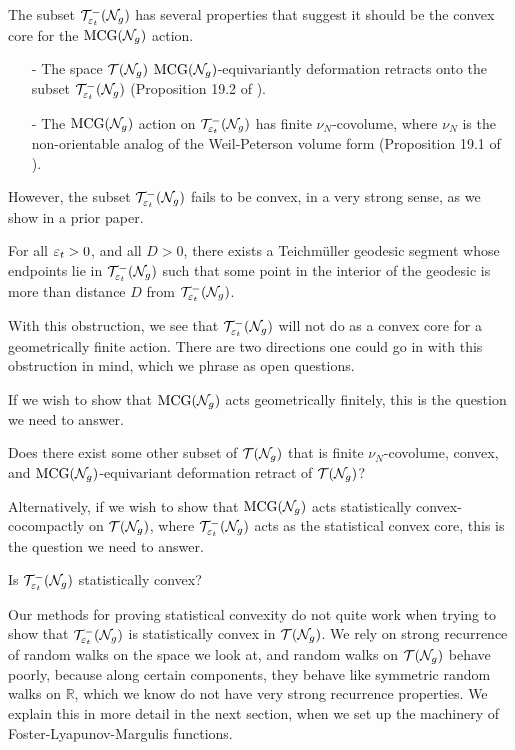 \documentclass[12pt, reqno]{amsart}
\begin{document}
The subset $\mathcal{T}_{\varepsilon_t}^{-}(\mathcal{N}_g)$ has several properties that suggest it should be the convex core for the $\mathrm{MCG}(\mathcal{N}_g)$ action.
\begin{itemize}
\item[-] The space $\mathcal{T}(\mathcal{N}_g)$ $\mathrm{MCG}(\mathcal{N}_g)$-equivariantly deformation retracts onto the subset $\mathcal{T}_{\varepsilon_t}^{-}(\mathcal{N}_g)$ (Proposition 19.2 of \cite{gendulphe2017whats}).
\item[-] The $\mathrm{MCG}(\mathcal{N}_g)$ action on $\mathcal{T}_{\varepsilon_t}^{-}(\mathcal{N}_g)$ has finite $\nu_N$-covolume, where $\nu_N$ is the non-orientable analog of the Weil-Peterson volume form (Proposition 19.1 of \cite{gendulphe2017whats}).
\end{itemize}

However, the subset $\mathcal{T}_{\varepsilon_t}^{-}(\mathcal{N}_g)$ fails to be convex, in a very strong sense, as we show in a prior paper.
\begin{theorem}
  For all $\varepsilon_t > 0$, and all $D > 0$, there exists a Teichmüller geodesic segment whose endpoints lie in $\mathcal{T}_{\varepsilon_t}^{-}(\mathcal{N}_g)$ such that some point in the interior of the geodesic is more than distance $D$ from $\mathcal{T}_{\varepsilon_t}^{-}(\mathcal{N}_g)$.
\end{theorem}

With this obstruction, we see that $\mathcal{T}_{\varepsilon_t}^{-}(\mathcal{N}_g)$ will not do as a convex core for a geometrically finite action.
There are two directions one could go in with this obstruction in mind, which we phrase as open questions.

If we wish to show that $\mathrm{MCG}(\mathcal{N}_g)$ acts geometrically finitely, this is the question we need to answer.
\begin{question}
  \label{ques:geom-finite-core}
  Does there exist some other subset of $\mathcal{T}(\mathcal{N}_g)$ that is finite $\nu_N$-covolume, convex, and $\mathrm{MCG}(\mathcal{N}_g)$-equivariant deformation retract of $\mathcal{T}(\mathcal{N}_g)$?
\end{question}

Alternatively, if we wish to show that $\mathrm{MCG}(\mathcal{N}_g)$ acts statistically convex-cocompactly on $\mathcal{T}(\mathcal{N}_g)$, where $\mathcal{T}_{\varepsilon_t}^{-}(\mathcal{N}_g)$ acts as the statistical convex core, this is the question we need to answer.

\begin{question}
  \label{ques:full-stat-core}
  Is $\mathcal{T}_{\varepsilon_t}^{-}(\mathcal{N}_g)$ statistically convex?
\end{question}

Our methods for proving statistical convexity do not quite work when trying to show that $\mathcal{T}_{\varepsilon_t}^{-}(\mathcal{N}_g)$ is statistically convex in $\mathcal{T}(\mathcal{N}_g)$.
We rely on strong recurrence of random walks on the space we look at, and random walks on $\mathcal{T}(\mathcal{N}_g)$ behave poorly, because along certain components, they behave like symmetric random walks on $\mathbb{R}$, which we know do not have very strong recurrence properties.
We explain this in more detail in the next section, when we set up the machinery of Foster-Lyapunov-Margulis functions.
\end{document}
